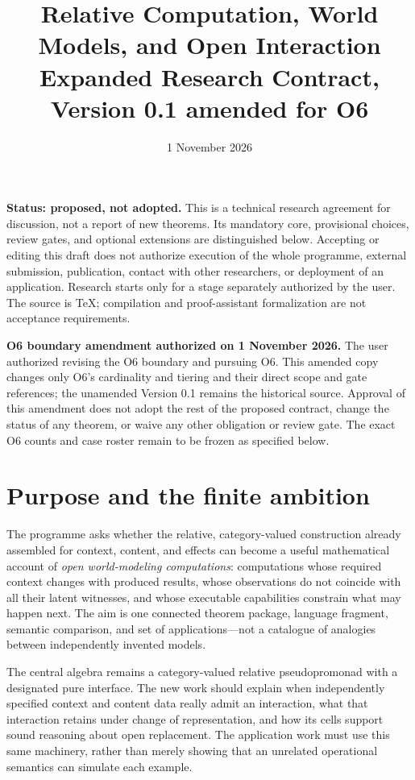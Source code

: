 \documentclass[11pt,a4paper]{article}
\title{Relative Computation, World Models, and Open Interaction\\[5pt]
\large Expanded Research Contract, Version 0.1 amended for O6}
\author{}
\date{1 November 2026}
\begin{document}
\maketitle
\vspace{-1em}

\textbf{Status: proposed, not adopted.}
This is a technical research agreement for discussion, not a report of new
theorems. Its mandatory core, provisional choices, review gates, and optional
extensions are distinguished below. Accepting or editing this draft does not
authorize execution of the whole programme, external submission, publication,
contact with other researchers, or deployment of an application. Research
starts only for a stage separately authorized by the user. The source is TeX;
compilation and proof-assistant formalization are not acceptance requirements.

\textbf{O6 boundary amendment authorized on 1 November 2026.}
The user authorized revising the O6 boundary and pursuing O6. This amended
copy changes only O6's cardinality and tiering and their direct scope and
gate references; the unamended Version 0.1 remains the historical source.
Approval of this amendment does not adopt the rest of the proposed contract,
change the status of any theorem, or waive any other obligation or review
gate. The exact O6 counts and case roster remain to be frozen as specified
below.

\section{Purpose and the finite ambition}\label{sec:purpose}

The programme asks whether the relative, category-valued construction already
assembled for context, content, and effects can become a useful mathematical
account of \emph{open world-modeling computations}: computations whose required
context changes with produced results, whose observations do not coincide with
all their latent witnesses, and whose executable capabilities constrain what
may happen next. The aim is one connected theorem package, language fragment,
semantic comparison, and set of applications---not a catalogue of analogies
between independently invented models.

The central algebra remains a category-valued relative pseudopromonad with a
designated pure interface. The new work should explain when independently
specified context and content data really admit an interaction, what that
interaction retains under change of representation, and how its cells support
sound reasoning about open replacement. The application work must use this
same machinery, rather than merely showing that an unrelated operational
semantics can simulate each example.
\end{document}
